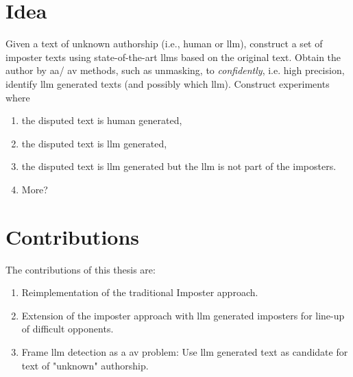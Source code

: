 \section{Idea}
\label{sec:idea}

Given a text of unknown authorship (i.e., human or \ac{llm}), 
construct a set of imposter texts using state-of-the-art \acp{llm} based on the original text.
Obtain the author by \ac{aa}/ \ac{av} methods, such as unmasking, to \textit{confidently}, i.e. high precision, identify \ac{llm} generated texts
(and possibly which \ac{llm}).
Construct experiments where
\begin{enumerate}
    \item the disputed text is human generated,
    \item the disputed text is \ac{llm} generated,
    \item the disputed text is \ac{llm} generated but the \ac{llm} is not part of the imposters.
    \item More?
\end{enumerate}


\section{Contributions}
\label{sec:contributions}
The contributions of this thesis are:
\begin{enumerate}
    \item Reimplementation of the traditional Imposter approach.
    \item Extension of the imposter approach with \ac{llm} generated imposters for line-up of difficult opponents. 
    \item Frame \ac{llm} detection as a \ac{av} problem: Use \ac{llm} generated text as candidate for text of "unknown" authorship.
\end{enumerate}
